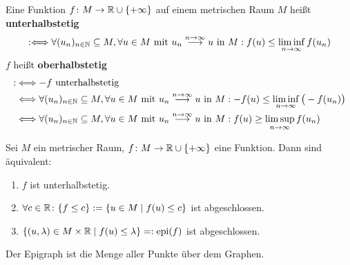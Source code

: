 \begin{definition}
	Eine Funktion $f\colon M\to\mathbb{R}\cup\lbrace+\infty\rbrace$ auf einem metrischen Raum $M$ heißt \textbf{unterhalbstetig}
	\begin{align*}
		:\Longleftrightarrow
		\forall(u_n)_{n\in\mathbb{N}}\subseteq M,\forall u\in M\text{ mit }
		u_n\stackrel{n\to\infty}{\longrightarrow} u\text{ in }M:
		f(u)\leq\liminf_{n\to\infty} f(u_n)
	\end{align*}
	$f$ heißt \textbf{oberhalbstetig}
	\begin{align*}
		:&\Longleftrightarrow -f\text{ unterhalbstetig}\\
		&\Longleftrightarrow
		\forall(u_n)_{n\in\mathbb{N}}\subseteq M,\forall u\in M\text{ mit }
		u_n\stackrel{n\to\infty}{\longrightarrow} u\text{ in }M:
		-f(u)\leq\liminf\limits_{n\to\infty}\big(-f(u_n)\big)\\
		&\Longleftrightarrow
		\forall(u_n)_{n\in\mathbb{N}}\subseteq M,\forall u\in M\text{ mit }
		u_n\stackrel{n\to\infty}{\longrightarrow} u\text{ in }M:
		f(u)\geq\limsup\limits_{n\to\infty} f(u_n)
	\end{align*}
\end{definition}

\begin{lemma}
	Sei $M$ ein metrischer Raum, $f\colon M\to\mathbb{R}\cup\lbrace+\infty\rbrace$ eine Funktion. 
	Dann sind äquivalent: 
	\begin{enumerate}[label=(\roman*)]
		\item $f$ ist unterhalbstetig.
		\item $\forall c\in\mathbb{R}\colon\lbrace f\leq c\rbrace:=\lbrace u\in M\mid f(u)\leq c\rbrace$ ist abgeschlossen.
		\item $\lbrace(u,\lambda)\in M\times\mathbb{R}\mid f(u)\leq\lambda\rbrace=:\operatorname{epi}(f)$ ist abgeschlossen.
	\end{enumerate}
\end{lemma}

\begin{bemerkung}
	Der Epigraph ist die Menge aller Punkte über dem Graphen.
\end{bemerkung}

